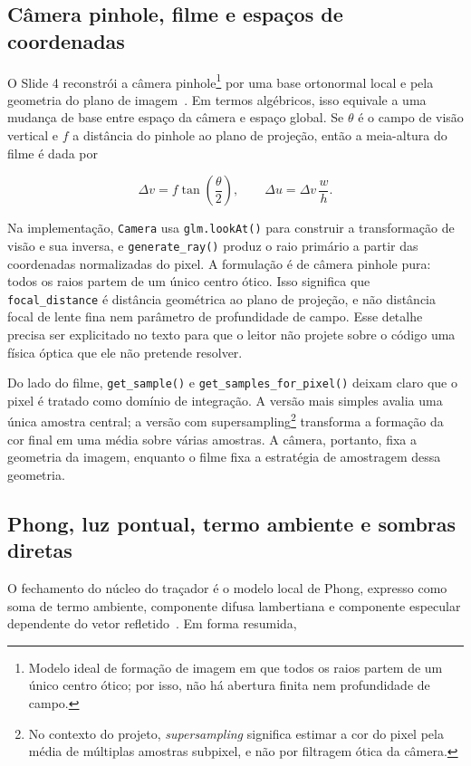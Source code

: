 \documentclass[portuguese]{sbcreviews-2025}%
\makeatletter
\newcommand{\slideurl}[1]{%
    \ifcsname slideurl@#1\endcsname
        \csname slideurl@#1\endcsname
    \else
        #1
    \fi
}
\newcommand{\slidescite}[2]{\citep[\href{\slideurl{#1}}{pp.~#2}]{#1}}
\makeatother
\begin{document}
\subsection{Câmera pinhole, filme e espaços de coordenadas}
\label{sec:camera-v3}

O Slide 4 reconstrói a câmera pinhole\footnote{Modelo ideal de formação de imagem em que todos os raios partem de um único centro ótico; por isso, não há abertura finita nem profundidade de campo.} por uma base ortonormal local e pela geometria do plano de imagem~\slidescite{inf2608slides04}{19--39}. Em termos algébricos, isso equivale a uma mudança de base entre espaço da câmera e espaço global. Se \(\theta\) é o campo de visão vertical e \(f\) a distância do pinhole ao plano de projeção, então a meia-altura do filme é dada por

\[
\Delta v = f\tan\left(\frac{\theta}{2}\right),
\qquad
\Delta u = \Delta v\,\frac{w}{h}.
\]

Na implementação, \texttt{Camera} usa \texttt{glm.lookAt()} para construir a transformação de visão e sua inversa, e \texttt{generate\_ray()} produz o raio primário a partir das coordenadas normalizadas do pixel. A formulação é de câmera pinhole pura: todos os raios partem de um único centro ótico. Isso significa que \texttt{focal\_distance} é distância geométrica ao plano de projeção, e não distância focal de lente fina nem parâmetro de profundidade de campo. Esse detalhe precisa ser explicitado no texto para que o leitor não projete sobre o código uma física óptica que ele não pretende resolver.

Do lado do filme, \texttt{get\_sample()} e \texttt{get\_samples\_for\_pixel()} deixam claro que o pixel é tratado como domínio de integração. A versão mais simples avalia uma única amostra central; a versão com supersampling\footnote{No contexto do projeto, \emph{supersampling} significa estimar a cor do pixel pela média de múltiplas amostras subpixel, e não por filtragem ótica da câmera.} transforma a formação da cor final em uma média sobre várias amostras. A câmera, portanto, fixa a geometria da imagem, enquanto o filme fixa a estratégia de amostragem dessa geometria.

\subsection{Phong, luz pontual, termo ambiente e sombras diretas}
\label{sec:phong-v3}

O fechamento do núcleo do traçador é o modelo local de Phong, expresso como soma de termo ambiente, componente difusa lambertiana e componente especular dependente do vetor refletido~\slidescite{inf2608slides04}{40--55}. Em forma resumida,
\end{document}
